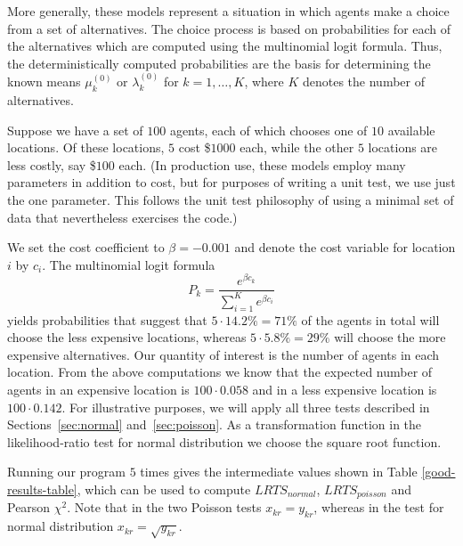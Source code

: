 \documentclass{sig-alternate-preprint}
\begin{document}
More generally, these models represent a
situation in which agents make a choice from a set of alternatives. The choice
process is based on probabilities for each of the alternatives which are
computed using the multinomial logit formula.  Thus, the deterministically
computed probabilities are the basis for determining the known means
$\mu_k^{(0)}$ or $\lambda_k^{(0)}$ for $k=1,\dots,K$, where $K$ denotes the
number of alternatives.

Suppose we have a set of $100$ agents, each of which
chooses one of $10$ available locations.  Of these locations,
$5$ cost \$$1000$ each, while the other $5$ locations are less costly, say
\$$100$ each. (In production use, these models employ
many parameters in addition to cost, but
for purposes of writing a unit test, we use just the one parameter.
This follows the unit test philosophy of using a minimal set of data that
nevertheless exercises the code.)

We set the cost coefficient
to $\beta = -0.001$ and denote the cost variable for location $i$ by
$c_i$. The multinomial logit formula
\[
 P_{k} = \frac{e^{\beta c_k}}{\sum_{i=1}^{K}e^{\beta c_i}}
\]
yields probabilities that suggest that $5\cdot 14.2 \% = 71 \%$ of the agents
in total will choose the less expensive locations, whereas $5 \cdot 5.8 \% =
29 \%$ will choose the more expensive alternatives. Our quantity of interest
is the number of agents in each location. From the above computations we know
that the expected number of agents in an expensive location is $100 \cdot
0.058$ and in a less expensive location is $100 \cdot 0.142$.  For illustrative
purposes, we will apply all
three tests described in Sections~\ref{sec:normal} and~\ref{sec:poisson}.  As
a transformation function in the likelihood-ratio test for normal distribution
we choose the square root function.

Running our program $5$ times gives the intermediate values
shown in Table \ref{good-results-table}, which can be used to compute
$LRTS_{normal}$, $LRTS_{poisson}$ and Pearson $\chi^{2}$. Note that in the
two Poisson tests $x_{kr}=y_{kr}$, whereas in the test for normal distribution
$x_{kr}=\sqrt{y_{kr}}$.
\end{document}
